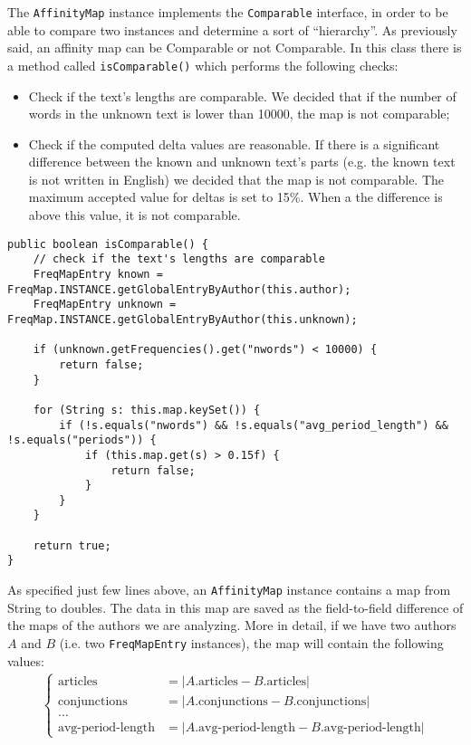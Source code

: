 \documentclass[a4paper,11pt, twoside]{article}
\begin{document}
		\noindent
		The \lstinline|AffinityMap| instance implements the \lstinline|Comparable| interface, in order to be able to compare two instances and determine a sort of ``hierarchy''. As previously said, an affinity map can be Comparable or not Comparable. In this class there is a method called \lstinline|isComparable()| which performs the following checks:
		\begin{itemize}
			\item Check if the text's lengths are comparable. We decided that if the number of words in the unknown text is lower than 10000, the map is not comparable;
			\item Check if the computed delta values are reasonable. If there is a significant difference between the known and unknown text's parts (e.g. the known text is not written in English) we decided that the map is not comparable. The maximum accepted value for deltas is set to 15\%. When a the difference is above this value, it is not comparable. 
		\end{itemize}

		\begin{lstlisting}[firstnumber=43,caption={AffinityMap isComparable method}, captionpos=b, label={lst:iscomparablemethod}]
public boolean isComparable() {
	// check if the text's lengths are comparable
	FreqMapEntry known = FreqMap.INSTANCE.getGlobalEntryByAuthor(this.author);
	FreqMapEntry unknown = FreqMap.INSTANCE.getGlobalEntryByAuthor(this.unknown);

	if (unknown.getFrequencies().get("nwords") < 10000) {
		return false;
	}

	for (String s: this.map.keySet()) {
		if (!s.equals("nwords") && !s.equals("avg_period_length") && !s.equals("periods")) {
			if (this.map.get(s) > 0.15f) {
				return false;
			}
		}
	}

	return true;
}
		\end{lstlisting}

	\noindent
	As specified just few lines above, an \lstinline|AffinityMap| instance contains a map from String to doubles. The data in this map are saved as the field-to-field difference of the maps of the authors we are analyzing. More in detail, if we have two authors $A$ and $B$ (i.e. two \lstinline|FreqMapEntry| instances), the map will contain the following values:
	\begin{align*}
		\begin{cases}
			\text{articles} &= |A.\text{articles} - B.\text{articles}| \\
			\text{conjunctions} &= |A. \text{conjunctions}- B.\text{conjunctions}| \\
			\dots& \\
			\text{avg-period-length}&= |A.\text{avg-period-length} - B.\text{avg-period-length}|
		\end{cases}
	\end{align*}
\end{document}
